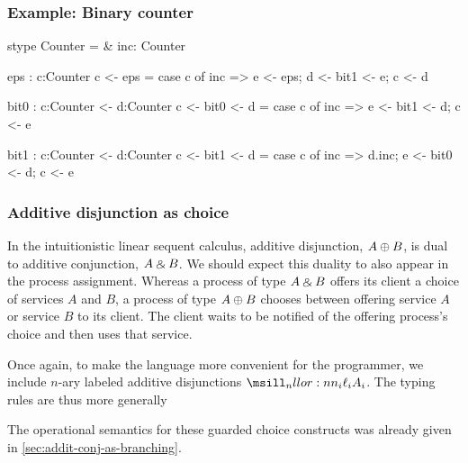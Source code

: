 \subsubsection{Example: Binary counter}\label{sec:exampl-binary-count}

\begin{pyglist}[language=text]
stype Counter = &{ inc: Counter }

eps : {c:Counter}
c <- eps =
{ case c of
    inc => e <- eps;
           d <- bit1 <- e;
           c <- d }

bit0 : {c:Counter <- d:Counter}
c <- bit0 <- d =
{ case c of
    inc => e <- bit1 <- d;
           c <- e }

bit1 : {c:Counter <- d:Counter}
c <- bit1 <- d =
{ case c of
    inc => d.inc;
           e <- bit0 <- d;
           c <- e }
\end{pyglist}


\subsubsection{Additive disjunction as choice}\label{sec:addit-disj-as-choice}

In the intuitionistic linear sequent calculus, additive disjunction, $A \oplus B$, is dual to additive conjunction, $A \mathbin{\binampersand} B$.
We should expect this duality to also appear in the process assignment.
Whereas a process of type $A \mathbin{\binampersand} B$ offers its client a choice of services $A$ and $B$, a process of type $A \oplus B$ chooses between offering service $A$ or service $B$ to its client.
The client waits to be notified of the offering process's choice and then uses that service.

Once again, to make the language more convenient for the programmer, we include $n$-ary labeled additive disjunctions $\nllor[_i]{{\ell_i}{A_i}}$.
The typing rules are thus more generally
The operational semantics for these guarded choice constructs was already given in \cref{sec:addit-conj-as-branching}.

